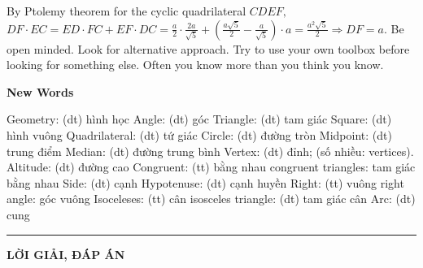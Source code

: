 \begin{multicols}{2}
\begin{figure}[H]
		\vspace*{-15pt}
	\end{figure}	
	By Ptolemy theorem for the cyclic quadrilateral $CDEF,$
	$DF \cdot EC = ED \cdot FC + EF \cdot DC 
	= \frac{a}{2}\cdot \frac{2a}{\sqrt{5}} + \left(\frac{a\sqrt{5}}{2} - \frac{a}{\sqrt{5}} \right) \cdot a
	= \frac{a^2\sqrt{5}}{2} \Rightarrow DF = a.$
	\vskip 0.1cm
	Be open minded. Look for alternative approach. Try to use your own toolbox before looking for something else.
	Often you know more than you think you know.
\end{multicols} 
\begin{tBox}
	\centerline{\color{toancuabi}\textbf{New Words}}
	\vspace*{-10pt}
	\begin{multicols}{2}
		{\color{toancuabi}Geometry}: (dt) hình học
		\vskip 0.1cm
		{\color{toancuabi}Angle}: (dt) góc
		\vskip 0.1cm
		{\color{toancuabi}Triangle}: (dt) tam giác 
		\vskip 0.1cm
		{\color{toancuabi}Square}: (dt) hình vuông
		\vskip 0.1cm
		{\color{toancuabi}Quadrilateral}: (dt) tứ giác
		\vskip 0.1cm 
		{\color{toancuabi}Circle}: (dt) đường tròn  
		\vskip 0.1cm
		{\color{toancuabi}Midpoint}: (dt) trung điểm
		\vskip 0.1cm
		{\color{toancuabi}Median}: (dt) đường trung bình  
		\vskip 0.1cm
		{\color{toancuabi}Vertex}: (dt) đỉnh; (số nhiều: vertices).
		\vskip 0.1cm
		{\color{toancuabi}Altitude}: (dt) đường cao
		\vskip 0.1cm
		{\color{toancuabi}Congruent}: (tt) bằng nhau
		\vskip 0.1cm
		{\color{toancuabi}congruent triangles}: tam giác bằng nhau 
		\vskip 0.1cm
		{\color{toancuabi}Side}: (dt)  cạnh
		\vskip 0.1cm
		{\color{toancuabi}Hypotenuse}: (dt) cạnh huyền 
		\vskip 0.1cm
		{\color{toancuabi}Right}: (tt) vuông
		\vskip 0.1cm
		{\color{toancuabi}right angle}: góc vuông
		\vskip 0.1cm 
		{\color{toancuabi}Isoceleses}: (tt) cân
		\vskip 0.1cm
		{\color{toancuabi}isosceles triangle}: (dt) tam giác cân 
		\vskip 0.1cm
		{\color{toancuabi}Arc}: (dt) cung
	\end{multicols}
\end{tBox}
\vspace*{-10pt}
{\color{toancuabi}\rule{1\linewidth}{0.1pt}}
\vskip 0.2cm
{\centerline{\textbf{\LARGE\color{toancuabi}LỜI GIẢI, ĐÁP ÁN}}}
